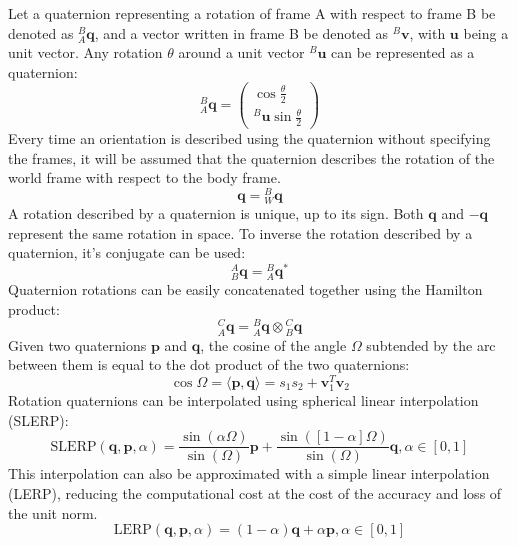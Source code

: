 Let a quaternion representing a rotation of frame A with respect to frame B be denoted as $^{B}_{A}\boldsymbol{q}$, and a vector written in frame B be denoted as ${}^{B}\mathbf{v}$, with $\mathbf{u}$ being a unit vector. Any rotation $\theta$ around a unit vector ${{}^{B}\mathbf{u}}$ can be represented as a quaternion:
\begin{equation}
	^{B}_{A}\boldsymbol{q} = \begin{pmatrix}\cos{\frac{\theta}{2}} \\
		{}^{B}\mathbf{u}\sin{\frac{\theta}{2}}\end{pmatrix}
	\label{eq:qt:rot1}
\end{equation}
Every time an orientation is described using the quaternion without specifying the frames, it will be assumed that the quaternion describes the rotation of the world frame with respect to the body frame.
\begin{equation}
	\boldsymbol{q} = {}^{B}_{W}\boldsymbol{q}
\end{equation}
A rotation described by a quaternion is unique, up to its sign. Both $\boldsymbol{q}$ and $-\boldsymbol{q}$ represent the same rotation in space.
To inverse the rotation described by a quaternion, it's conjugate can be used:
\begin{equation}
	^{A}_{B}\boldsymbol{q} = {}^{B}_{A}\boldsymbol{q}^*
\end{equation}
Quaternion rotations can be easily concatenated together using the Hamilton product:\
\begin{equation}
	^{C}_{A}\boldsymbol{q} = {}^{B}_{A}\boldsymbol{q} \otimes {}^{C}_{B}\boldsymbol{q}
\end{equation}
Given two quaternions $\boldsymbol{p}$ and $\boldsymbol{q}$, the cosine of the angle $\Omega$ subtended by the arc between them is equal to the dot product of the two quaternions:
\begin{equation}
	\cos{\Omega} = \langle{\boldsymbol{p}, \boldsymbol{q}}\rangle = s_1s_2 + \boldsymbol{v}_1^T\boldsymbol{v}_2
\end{equation}
Rotation quaternions can be interpolated using spherical linear interpolation (SLERP):
\begin{equation}
	\text{SLERP}(\boldsymbol{q},\boldsymbol{p}, \alpha) =  \frac{\sin(\alpha\Omega)}{\sin(\Omega)}\boldsymbol{p} + \frac{\sin([1-\alpha]\Omega)}{\sin(\Omega)}\boldsymbol{q}, \alpha \in [0, 1]
\end{equation}
This interpolation can also be approximated with a simple linear interpolation (LERP), reducing the computational cost at the cost of the accuracy and loss of the unit norm.
\begin{equation}
	\text{LERP}(\boldsymbol{q},\boldsymbol{p}, \alpha) =  (1-\alpha)\boldsymbol{q} + \alpha\boldsymbol{p}, \alpha \in [0, 1]
\end{equation}


